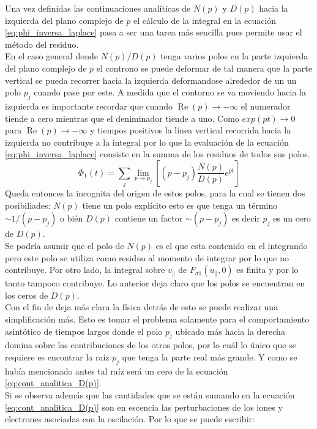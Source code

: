 \documentclass[../tesis_main_file.tex]{subfiles}
\begin{document}
Una vez definidas las continuaciones analíticas de $N(p)$ y $D(p)$ hacia la izquierda del plano complejo de $p$ el cálculo de la integral en la ecuación \ref{eq:phi_inversa_laplace} pasa a ser una tarea más sencilla pues permite usar el método del residuo.\\
En el caso general donde $N(p)/D(p)$ tenga varios polos en la parte izquierda del plano complejo de $p$ el controno se puede deformar de tal manera que la parte vertical se pueda recorrer hacia la izquierda deformandose alrededor de un un polo $p_j$ cuando pase por este. A medida que el contorno se va moviendo hacia la izquierda es importante recordar que cuando $\operatorname{Re}(p)\rightarrow - \infty$ el numerador tiende a cero mientras que el deniminador tiende a uno. Como $exp(pt)\rightarrow 0$ para $\operatorname{Re}(p)\rightarrow - \infty$ y tiempos positivos la línea vertical recorrida hacia la izquierda no contribuye a la integral por lo que la evaluación de la ecuación \ref{eq:phi_inversa_laplace} consiste en la summa de los residuos de todos sus polos.
\begin{equation}
\label{eq:Phi_suma_residuos}
\Phi_1 (t)=\sum_j \lim _{p\to p_j}\left[(p-p_j)\frac{N(p)}{D(p)}e^{pt}\right]
\end{equation}
Queda entonces la incognita del origen de estos polos, para la cual se tienen dos posibiliades: $N(p)$ tiene un polo explícito esto es que tenga un término $\sim 1 /(p-p_j)$ o bién $D(p)$ contiene un factor $\sim (p-p_j)$ es decir $p_j$ es un cero de $D(p)$.\\
Se podría asumir que el polo de $N(p)$ es el que esta contenido en el integrando pero este polo se utiliza como residuo al momento de integrar por lo que no contribuye. Por otro lado, la integral sobre $v_{\parallel}$ de $F_{\sigma 1}(u_{\parallel},0)$ es finita y por lo tanto tampoco contribuye. Lo anterior deja claro que los polos se encuentran en los ceros de $D(p)$.\\
Con el fin de deja más clara la física detrás de esto se puede realizar una simplificación más. Esto es tomar el problema solamente para el comportamiento asintótico de tiempos largos donde  el polo $p_j$ ubicado más hacia la derecha domina sobre las contribuciones de los otros polos, por lo cuál lo único que se requiere es encontrar la raíz $p_j$ que tenga la parte real más grande. Y como se había mencionado antes tal raíz será un cero de la ecuación \ref{eq:cont_analitica_D(p)}.\\
Si se observa además que las cantidades que se están sumando en la ecuación \ref{eq:cont_analitica_D(p)} son en escencia las perturbaciones de los iones y electrones asociadas con la oscilación. Por lo que se puede escribir:
\end{document}
